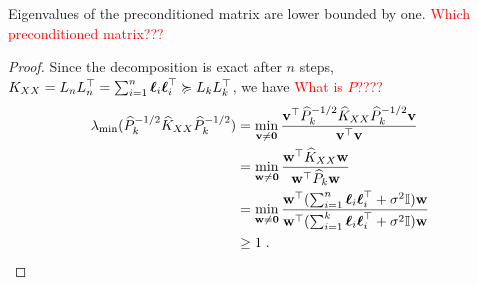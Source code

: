 \documentclass{article}
\begin{document}
{\begin{proposition}\label{thm:pivchol_precond}
Eigenvalues of the preconditioned matrix are lower bounded by one. \textcolor{red}{Which preconditioned matrix???}
\end{proposition}

\begin{proof} %
Since the decomposition is exact after $n$ steps, $K_{XX} = L_nL_n^\top =\sum_{i=1}^n \boldsymbol{\mathbf{\ell}}_i\boldsymbol{\mathbf{\ell}}_i^\top \succcurlyeq L_kL_k^\top$, we have \textcolor{red}{What is $\widehat{P}$????}
\begin{align*}
\lambda_{\min}( \widehat P_k^{-1/2} \widehat K_{XX} \widehat P_k^{-1/2} )
&= \min_{\vect v \neq \vect 0 } \frac{\vect v^\top \widehat P_k^{-1/2} \widehat K_{XX} \widehat P_k^{-1/2} \vect v}{ \vect v^\top \vect v} \\
&= \min_{\vect w \neq \vect 0} \frac{\vect w^\top \widehat K_{XX} \vect w}{\vect w^\top \widehat P_k \vect w} \\
&= \min_{\vect w \neq \vect 0} \frac{\vect w^\top (\sum_{i=1}^n \vect\ell_i \vect \ell_i^\top + \sigma^2 \Id) \vect w}{\vect w^\top (\sum_{i=1}^k \vect\ell_i \vect \ell_i^\top + \sigma^2 \Id) \vect w}\\
& \ge 1 \;.
\end{align*}

\end{proof}

}
\end{document}
